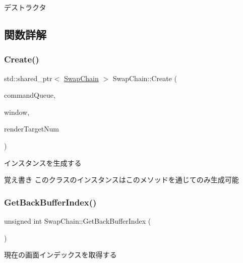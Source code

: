デストラクタ 



\subsection{関数詳解}
\mbox{\label{class_swap_chain_a9a5c8d8da8a81471009df868054c02e3}} 
\subsubsection{\texorpdfstring{Create()}{Create()}}
{\footnotesize\ttfamily std\+::shared\+\_\+ptr$<$ \mbox{\hyperlink{class_swap_chain}{Swap\+Chain}} $>$ Swap\+Chain\+::\+Create (\begin{DoxyParamCaption}\item[{std\+::shared\+\_\+ptr$<$ \mbox{\hyperlink{class_command_queue}{Command\+Queue}} $>$}]{command\+Queue,  }\item[{const \mbox{\hyperlink{class_window}{Window}} \&}]{window,  }\item[{unsigned int}]{render\+Target\+Num }\end{DoxyParamCaption})\hspace{0.3cm}{\ttfamily [static]}}



インスタンスを生成する 

\begin{DoxyNote}{覚え書き}
このクラスのインスタンスはこのメソッドを通じてのみ生成可能 
\end{DoxyNote}
\mbox{\label{class_swap_chain_a30a3e70cede922d5310b82b758ddd10f}} 
\subsubsection{\texorpdfstring{Get\+Back\+Buffer\+Index()}{GetBackBufferIndex()}}
{\footnotesize\ttfamily unsigned int Swap\+Chain\+::\+Get\+Back\+Buffer\+Index (\begin{DoxyParamCaption}{ }\end{DoxyParamCaption})}



現在の画面インデックスを取得する 

